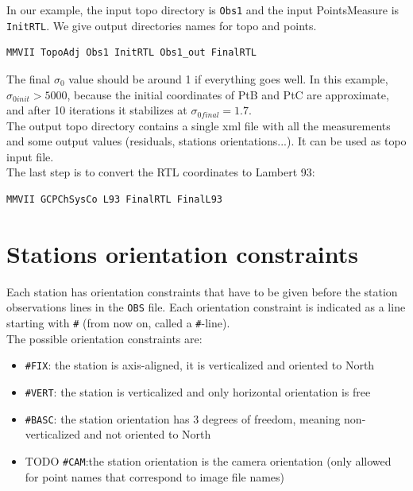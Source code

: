 In our example, the input topo directory is \texttt{Obs1} and the input PointsMeasure is \texttt{InitRTL}.
We give output directories names for topo and points.
\begin{lstlisting}
MMVII TopoAdj Obs1 InitRTL Obs1_out FinalRTL
\end{lstlisting}

The final $\sigma_0$ value should be around 1 if everything goes well.
In this example, $\sigma_{0 init} > 5000$, because the initial coordinates of PtB and PtC are approximate,
and after 10 iterations it stabilizes at $\sigma_{0 final} = 1.7$.
\\

The output topo directory contains a single xml file with all the measurements and some output values (residuals,
stations orientations...). It can be used as topo input file.
\\

The last step is to convert the RTL coordinates to Lambert 93:

\begin{lstlisting}
MMVII GCPChSysCo L93 FinalRTL FinalL93
\end{lstlisting}


\section{Stations orientation constraints}

Each station has orientation constraints that have to be given before the station observations lines in the \texttt{OBS} file.
Each orientation constraint is indicated as a line starting with \texttt{\#} (from now on, called a \texttt{\#}-line).
\\

The possible orientation constraints are:
\begin{itemize}
   \item \texttt{\#FIX}: the station is axis-aligned, it is verticalized and oriented to North
   \item \texttt{\#VERT}: the station is verticalized and only horizontal orientation is free
   \item \texttt{\#BASC}: the station orientation has 3 degrees of freedom, meaning non-verticalized and not oriented to North
   \item TODO \texttt{\#CAM}:the station orientation is the camera orientation (only allowed for point names that correspond to image file names)
\end{itemize}

